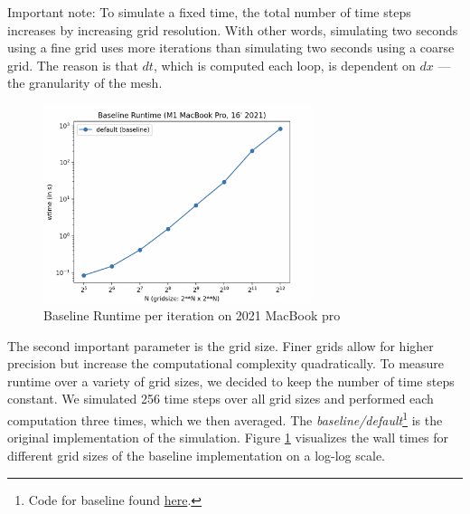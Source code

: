 \documentclass[a4paper,10pt]{article}
\begin{document}
Important note:
To simulate a fixed time, the total number of time steps increases by increasing grid resolution.
With other words, simulating two seconds using a fine grid uses more iterations than simulating two seconds using a coarse grid. 
The reason is that $dt$, which is computed each loop, is dependent on $dx$ --- the granularity of the mesh.
\begin{figure}[hb]
  \centering
  \includegraphics[width=0.7\textwidth]{images/baseline/baseline_performance.png}
  \caption{Baseline Runtime per iteration on 2021 MacBook pro}
  \label{fig:runtime_baseline}
\end{figure}

The second important parameter is the grid size.
Finer grids allow for higher precision but increase the computational complexity quadratically.
To measure runtime over a variety of grid sizes, we decided to keep the number of time steps constant.
We simulated 256 time steps over all grid sizes and performed each computation three times, which we then averaged.
The \textit{baseline/default}\footnote{Code for baseline found \href{https://github.com/paulmyr/DD2358-HPC25/blob/master/10_project_rishi_paul/code/finitevolume_runtimeplots.py}{here}.} is the original implementation of the simulation.
Figure \ref{fig:runtime_baseline} visualizes the wall times for different grid sizes of the baseline implementation on a log-log scale.
\end{document}
